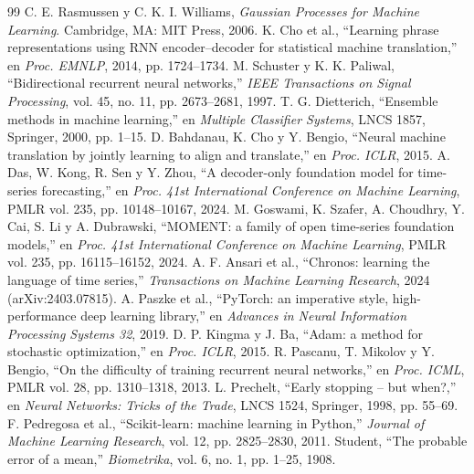 \documentclass[11pt,a4paper]{amsart}
\begin{document}
\begin{thebibliography}{99}
 C. E. Rasmussen y C. K. I. Williams, \emph{Gaussian Processes for Machine Learning}. Cambridge, MA: MIT Press, 2006.
 K. Cho et al., ``Learning phrase representations using RNN encoder--decoder for statistical machine translation,'' en \emph{Proc. EMNLP}, 2014, pp. 1724--1734.
 M. Schuster y K. K. Paliwal, ``Bidirectional recurrent neural networks,'' \emph{IEEE Transactions on Signal Processing}, vol. 45, no. 11, pp. 2673--2681, 1997.
 T. G. Dietterich, ``Ensemble methods in machine learning,'' en \emph{Multiple Classifier Systems}, LNCS 1857, Springer, 2000, pp. 1--15.
 D. Bahdanau, K. Cho y Y. Bengio, ``Neural machine translation by jointly learning to align and translate,'' en \emph{Proc. ICLR}, 2015.
 A. Das, W. Kong, R. Sen y Y. Zhou, ``A decoder-only foundation model for time-series forecasting,'' en \emph{Proc. 41st International Conference on Machine Learning}, PMLR vol. 235, pp. 10148--10167, 2024.
 M. Goswami, K. Szafer, A. Choudhry, Y. Cai, S. Li y A. Dubrawski, ``MOMENT: a family of open time-series foundation models,'' en \emph{Proc. 41st International Conference on Machine Learning}, PMLR vol. 235, pp. 16115--16152, 2024.
 A. F. Ansari et al., ``Chronos: learning the language of time series,'' \emph{Transactions on Machine Learning Research}, 2024 (arXiv:2403.07815).
 A. Paszke et al., ``PyTorch: an imperative style, high-performance deep learning library,'' en \emph{Advances in Neural Information Processing Systems 32}, 2019.
 D. P. Kingma y J. Ba, ``Adam: a method for stochastic optimization,'' en \emph{Proc. ICLR}, 2015.
 R. Pascanu, T. Mikolov y Y. Bengio, ``On the difficulty of training recurrent neural networks,'' en \emph{Proc. ICML}, PMLR vol. 28, pp. 1310--1318, 2013.
 L. Prechelt, ``Early stopping -- but when?,'' en \emph{Neural Networks: Tricks of the Trade}, LNCS 1524, Springer, 1998, pp. 55--69.
 F. Pedregosa et al., ``Scikit-learn: machine learning in Python,'' \emph{Journal of Machine Learning Research}, vol. 12, pp. 2825--2830, 2011.
 Student, ``The probable error of a mean,'' \emph{Biometrika}, vol. 6, no. 1, pp. 1--25, 1908.
\end{thebibliography}

\appendix
\end{document}
